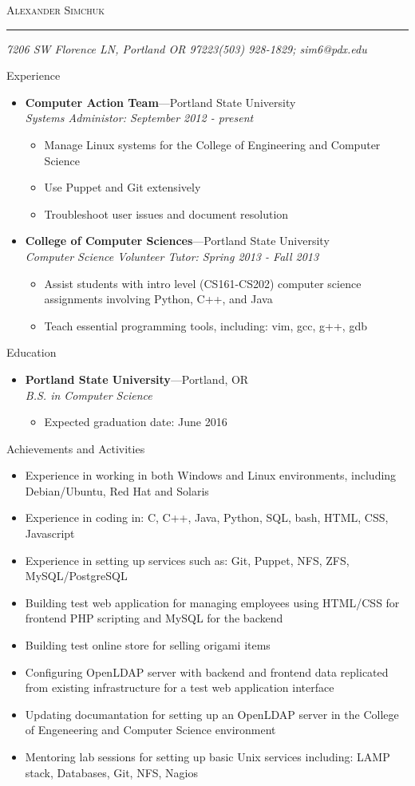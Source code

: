 \documentclass[11pt,oneside]{article}
\makeatletter
\newcommand{\name}{Alexander Simchuk}
\newcommand{\addr}{7206 SW Florence LN, Portland OR 97223}
\newcommand{\phone}{(503) 928-1829}
\newcommand{\email}{sim6@pdx.edu}
\newcommand{\bigname}[1]{
	\begin{center}\fontfamily{phv}\selectfont\Huge\scshape#1\end{center}
}
\newenvironment{ressection}[1]{
	\vspace{4pt}
	{\fontfamily{phv}\selectfont\Large#1}
	\begin{itemize}
	\vspace{3pt}
}{
	\end{itemize}
}
\newcommand{\resitem}[1]{
	\vspace{-4pt}
	\item \begin{flushleft} #1 \end{flushleft}
}
\newcommand{\ressubitem}[1]{
	\vspace{-1pt}
	\item \begin{flushleft} #1 \end{flushleft}
}
\newcommand{\resbigitem}[3]{
	\vspace{-5pt}
	\item
	\textbf{#1}---#2 \\
	\textit{#3}
}
\newenvironment{ressubsec}[3]{
	\resbigitem{#1}{#2}{#3}
	\vspace{-2pt}
	\begin{itemize}
}{
	\end{itemize}
}
\makeatother
\begin{document}
 \selectfont
\bigname{\name}
\vspace{-8pt} \rule{\textwidth}{1pt}
\vspace{-1pt} {\small\itshape \addr \hfill \phone; \email}
\vspace{8 pt}


\begin{ressection}{Experience}
    \begin{ressubsec}{Computer Action Team}{Portland State University}{Systems Administor: September 2012 - present}
		\ressubitem{Manage Linux systems for the College of Engineering and Computer Science}
		\ressubitem{Use Puppet and Git extensively}
		\ressubitem{Troubleshoot user issues and document resolution}
	\end{ressubsec}
	\begin{ressubsec}{College of Computer Sciences}{Portland State University}{Computer Science Volunteer Tutor: Spring 2013 - Fall 2013}
        \ressubitem{Assist students with intro level (CS161-CS202) computer science assignments involving Python, C++, and Java}
        \ressubitem{Teach essential programming tools, including: vim, gcc, g++, gdb}
	\end{ressubsec}
\end{ressection}


\begin{ressection}{Education}
    \begin{ressubsec}{Portland State University}{Portland, OR}{B.S. in Computer Science}
		\ressubitem{Expected graduation date: June 2016}
	\end{ressubsec}
\end{ressection}


\begin{ressection}{Achievements and Activities}
    \resitem{Experience in working in both Windows and Linux environments, including Debian/Ubuntu, Red Hat and Solaris}
    \resitem{Experience in coding in: C, C++, Java, Python, SQL, bash, HTML, CSS, Javascript}
    \resitem{Experience in setting up services such as: Git, Puppet, NFS, ZFS, MySQL/PostgreSQL}
    \resitem{Building test web application for managing employees using HTML/CSS for frontend PHP scripting and MySQL for the backend}
    \resitem{Building test online store for selling origami items}
    \resitem{Configuring OpenLDAP server with backend and frontend data replicated from existing infrastructure for a test web application interface}
    \resitem{Updating documantation for setting up an OpenLDAP server in the College of Engeneering and Computer Science environment}
    \resitem{Mentoring lab sessions for setting up basic Unix services including: LAMP stack, Databases, Git, NFS, Nagios}
\end{ressection}
\end{document}
